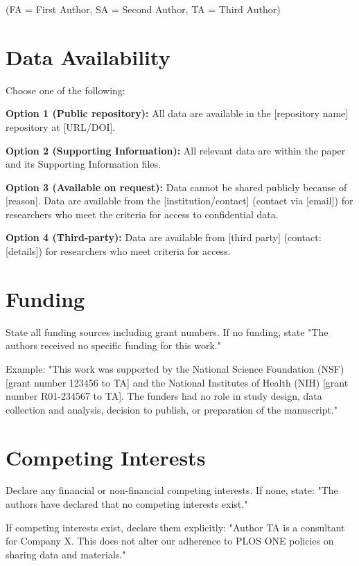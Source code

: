 \documentclass[10pt,letterpaper]{article}
\begin{document}
(FA = First Author, SA = Second Author, TA = Third Author)

\section*{Data Availability}

Choose one of the following:

\textbf{Option 1 (Public repository):} 
All data are available in the [repository name] repository at [URL/DOI].

\textbf{Option 2 (Supporting Information):}
All relevant data are within the paper and its Supporting Information files.

\textbf{Option 3 (Available on request):}
Data cannot be shared publicly because of [reason]. Data are available from the [institution/contact] (contact via [email]) for researchers who meet the criteria for access to confidential data.

\textbf{Option 4 (Third-party):}
Data are available from [third party] (contact: [details]) for researchers who meet criteria for access.

\section*{Funding}

State all funding sources including grant numbers. If no funding, state "The authors received no specific funding for this work."

Example: "This work was supported by the National Science Foundation (NSF) [grant number 123456 to TA] and the National Institutes of Health (NIH) [grant number R01-234567 to TA]. The funders had no role in study design, data collection and analysis, decision to publish, or preparation of the manuscript."

\section*{Competing Interests}

Declare any financial or non-financial competing interests. If none, state: "The authors have declared that no competing interests exist."

If competing interests exist, declare them explicitly: "Author TA is a consultant for Company X. This does not alter our adherence to PLOS ONE policies on sharing data and materials."
\end{document}
